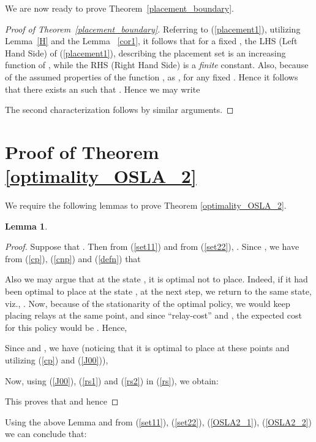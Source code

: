 \documentclass[conference]{IEEEtran}
\newtheorem{lemma}{Lemma}
\begin{document}
We are now ready to prove Theorem~\ref{placement_boundary}.
\begin{proof}[Proof of Theorem~\ref{placement_boundary}]
Referring to (\ref{placement1}), utilizing Lemma~\ref{H} and the Lemma ~\ref{cor1}, it follows that for a fixed , the LHS (Left Hand Side) of (\ref{placement1}), describing the placement set  is an increasing function of , while the RHS (Right Hand Side) is a \emph{finite} constant. Also, because of the assumed properties of the function ,  as , for any 
fixed . Hence it follows that there exists an  such that 
. Hence we may write 

The second characterization follows by similar arguments. 
\end{proof}

\section{Proof of Theorem \ref{optimality_OSLA_2}}
\label{optimality_OSLA_2_appendix}

We require the following lemmas to prove Theorem \ref{optimality_OSLA_2}.

\begin{lemma}

\end{lemma}

\begin{proof}
Suppose that . 
Then from (\ref{set11})  and from 
(\ref{set22}), . 
Since , we have from  (\ref{cp}), (\ref{cnp}) and (\ref{defn}) that 

Also we may argue that at the state , it is optimal not to place. Indeed, if it had been optimal to place at the state , at the next step, we return to the same state, viz., . Now, because of the stationarity of the optimal policy, we would keep placing relays at the same point, and since ``relay-cost''  and , the expected cost for this policy would be . Hence,
 
Since  and , we have (noticing that it is optimal to place at these points and utilizing (\ref{cp}) and (\ref{J00})),  

Now, using (\ref{J00}), (\ref{rs1}) and (\ref{rs2}) in (\ref{rs}), we obtain:

This proves that 
 and hence

\end{proof}

Using the above Lemma and from (\ref{set11}), (\ref{set22}),
(\ref{OSLA2_1}), (\ref{OSLA2_2}) we can conclude that:
\end{document}
